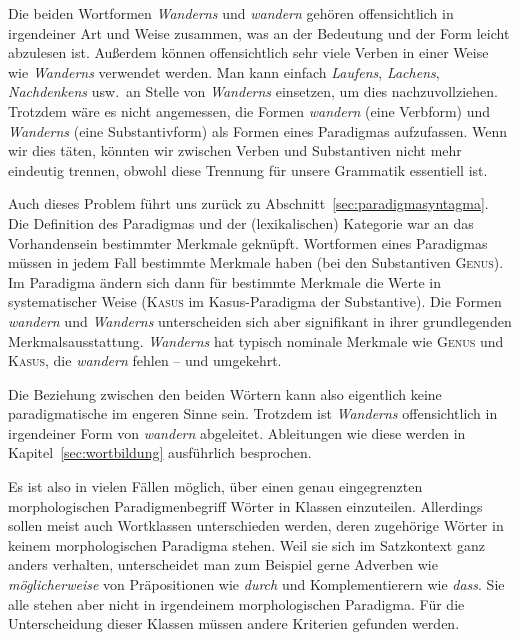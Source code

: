 Die beiden Wortformen \textit{Wanderns} und \textit{wandern} gehören offensichtlich in irgendeiner Art und Weise zusammen, was an der Bedeutung und der Form leicht abzulesen ist.
Außerdem können offensichtlich sehr viele Verben in einer Weise wie \textit{Wanderns} verwendet werden.
Man kann einfach \textit{Laufens}, \textit{Lachens}, \textit{Nachdenkens} usw.\ an Stelle von \textit{Wanderns} einsetzen, um dies nachzuvollziehen.
Trotzdem wäre es nicht angemessen, die Formen \textit{wandern} (eine Verbform) und \textit{Wanderns} (eine Substantivform) als Formen eines Paradigmas aufzufassen.
Wenn wir dies täten, könnten wir zwischen Verben und Substantiven nicht mehr eindeutig trennen, obwohl diese Trennung für unsere Grammatik essentiell ist.

Auch dieses Problem führt uns zurück zu Abschnitt~\ref{sec:paradigmasyntagma}.
Die Definition des Paradigmas und der (lexikalischen) Kategorie war an das Vorhandensein bestimmter Merkmale geknüpft.
Wortformen eines Paradigmas müssen in jedem Fall bestimmte Merkmale haben (bei den Substantiven \zB \textsc{Genus}).
Im Paradigma ändern sich dann für bestimmte Merkmale die Werte in systematischer Weise (\zB \textsc{Kasus} im Kasus-Paradigma der Substantive).
Die Formen \textit{wandern} und \textit{Wanderns} unterscheiden sich aber signifikant in ihrer grundlegenden Merkmalsausstattung.
\textit{Wanderns} hat typisch nominale Merkmale wie \textsc{Genus} und \textsc{Kasus}, die \textit{wandern} fehlen -- und umgekehrt.

\begin{exe}
\end{exe}


Die Beziehung zwischen den beiden Wörtern kann also eigentlich keine paradigmatische im engeren Sinne sein.
Trotzdem ist \textit{Wanderns} offensichtlich in irgendeiner Form von \textit{wandern} abgeleitet.
Ableitungen wie diese werden in Kapitel~\ref{sec:wortbildung} ausführlich besprochen.

Es ist also in vielen Fällen möglich, über einen genau eingegrenzten morphologischen Paradigmenbegriff Wörter in Klassen einzuteilen.
Allerdings sollen meist auch Wortklassen unterschieden werden, deren zugehörige Wörter in keinem morphologischen Paradigma stehen.
Weil sie sich im Satzkontext ganz anders verhalten, unterscheidet man zum Beispiel gerne Adverben wie \textit{möglicherweise} von Präpositionen wie \textit{durch} und Komplementierern wie \textit{dass}.
Sie alle stehen aber nicht in irgendeinem morphologischen Paradigma.
Für die Unterscheidung dieser Klassen müssen andere Kriterien gefunden werden.

